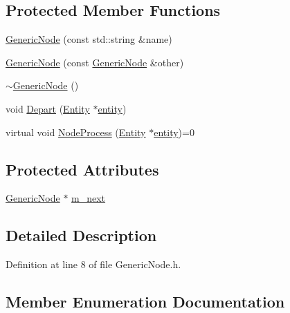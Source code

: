 \subsection*{Protected Member Functions}
\begin{DoxyCompactItemize}
\item 
\hyperlink{class_generic_node_acf8f931dab598c16e00255257fee132d}{Generic\+Node} (const std\+::string \&name)
\item 
\hyperlink{class_generic_node_a9b0f3cb66385b487944d4f28069546f3}{Generic\+Node} (const \hyperlink{class_generic_node}{Generic\+Node} \&other)
\item 
\hyperlink{class_generic_node_ae97c1f46c781cbf09bfa7054097baa2a}{$\sim$\+Generic\+Node} ()
\item 
void \hyperlink{class_generic_node_a2d573208cd3bc049c7068a331c6cd294}{Depart} (\hyperlink{class_entity}{Entity} $\ast$\hyperlink{_entity_8h_ad79a57ed3105eb60d991a1aeb4a9dc44a428e8fcd53019fa239fa3419261e499e}{entity})
\item 
virtual void \hyperlink{class_generic_node_ae942258a57f211072d179da470579add}{Node\+Process} (\hyperlink{class_entity}{Entity} $\ast$\hyperlink{_entity_8h_ad79a57ed3105eb60d991a1aeb4a9dc44a428e8fcd53019fa239fa3419261e499e}{entity})=0
\end{DoxyCompactItemize}
\subsection*{Protected Attributes}
\begin{DoxyCompactItemize}
\item 
\hyperlink{class_generic_node}{Generic\+Node} $\ast$ \hyperlink{class_generic_node_af1d326d888b277b40d55b3c67be446d7}{m\+\_\+next}
\end{DoxyCompactItemize}


\subsection{Detailed Description}


Definition at line 8 of file Generic\+Node.\+h.



\subsection{Member Enumeration Documentation}
\mbox{\label{class_generic_node_a9e7985ab9bbfa1c85091adc0ab71a6b6}} 

